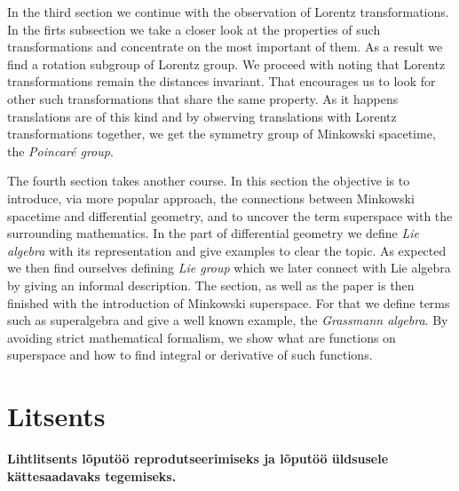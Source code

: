 \documentclass[12pt,a4paper,oneside]{article}
\theoremstyle{plain}
\theoremstyle{definition}
\numberwithin{equation}{section}
\begin{document}
In the third section we continue with the observation 
of Lorentz transformations. In the firts subsection we 
take a closer look at the properties of such 
transformations and concentrate on the most important of 
them. As a result we find a rotation subgroup of Lorentz 
group. We proceed with noting that Lorentz transformations 
remain the distances invariant. That encourages us to 
look for other such transformations that share the same 
property. As it happens translations are of this kind and 
by observing translations with Lorentz transformations 
together, we get the symmetry group of Minkowski spacetime, 
the \emph{Poincar\'e group}.

The fourth section takes another course. In this section 
the objective is to introduce, via more popular approach, 
the connections between Minkowski spacetime and 
differential geometry, and to uncover the term superspace 
with the surrounding mathematics. In the part of 
differential geometry we define \emph{Lie algebra} with 
its representation and give examples to 
clear the topic. As expected we then find ourselves 
defining \emph{Lie group} which we later connect with 
Lie algebra by giving an informal description. The section,
as well as the paper is then finished with the 
introduction of Minkowski superspace. For that we define 
terms such as superalgebra and give a well known example, 
the \emph{Grassmann algebra}. By avoiding strict 
mathematical formalism, we show what are functions on 
superspace and how to find integral or derivative of such 
functions.

\newpage



\newpage
\pagestyle{empty}
\section*{Litsents}

\textbf{Lihtlitsents lõputöö reprodutseerimiseks ja 
	lõputöö üldsusele kätte\-saadavaks tegemiseks.}
\end{document}
